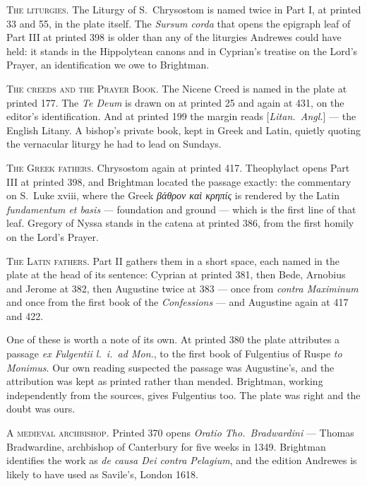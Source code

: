 \vspace{0.8\baselineskip}
{\scshape The liturgies.}\quad
The Liturgy of S.\ Chrysostom is named twice in Part I, at printed 33 and 55, in
the plate itself. The \emph{Sursum corda} that opens the epigraph leaf of Part III
at printed 398 is older than any of the liturgies Andrewes could have held: it
stands in the Hippolytean canons and in Cyprian's treatise on the Lord's Prayer,
an identification we owe to Brightman.

\vspace{0.8\baselineskip}
{\scshape The creeds and the Prayer Book.}\quad
The Nicene Creed is named in the plate at printed 177. The \emph{Te Deum} is drawn
on at printed 25 and again at 431, on the editor's identification. And at printed
199 the margin reads [\emph{Litan.\ Angl.}] --- the English Litany. A bishop's
private book, kept in Greek and Latin, quietly quoting the vernacular liturgy he
had to lead on Sundays.

\vspace{0.8\baselineskip}
{\scshape The Greek fathers.}\quad
Chrysostom again at printed 417. Theophylact opens Part III at printed 398, and
Brightman located the passage exactly: the commentary on S.\ Luke xviii, where the
Greek \emph{βάθρον καὶ κρηπίς} is rendered by the Latin \emph{fundamentum et
basis} --- foundation and ground --- which is the first line of that leaf. Gregory
of Nyssa stands in the catena at printed 386, from the first homily on the Lord's
Prayer.

\vspace{0.8\baselineskip}
{\scshape The Latin fathers.}\quad
Part II gathers them in a short space, each named in the plate at the head of its
sentence: Cyprian at printed 381, then Bede, Arnobius and Jerome at 382, then
Augustine twice at 383 --- once from \emph{contra Maximinum} and once from the
first book of the \emph{Confessions} --- and Augustine again at 417 and 422.

One of these is worth a note of its own. At printed 380 the plate attributes a
passage \emph{ex Fulgentii l.\ i.\ ad Mon.}, to the first book of Fulgentius of
Ruspe \emph{to Monimus}. Our own reading suspected the passage was Augustine's,
and the attribution was kept as printed rather than mended. Brightman, working
independently from the sources, gives Fulgentius too. The plate was right and the
doubt was ours.

\vspace{0.8\baselineskip}
{\scshape A medieval archbishop.}\quad
Printed 370 opens \emph{Oratio Tho.\ Bradwardini} --- Thomas Bradwardine,
archbishop of Canterbury for five weeks in 1349. Brightman identifies the work as
\emph{de causa Dei contra Pelagium}, and the edition Andrewes is likely to have
used as Savile's, London 1618.

